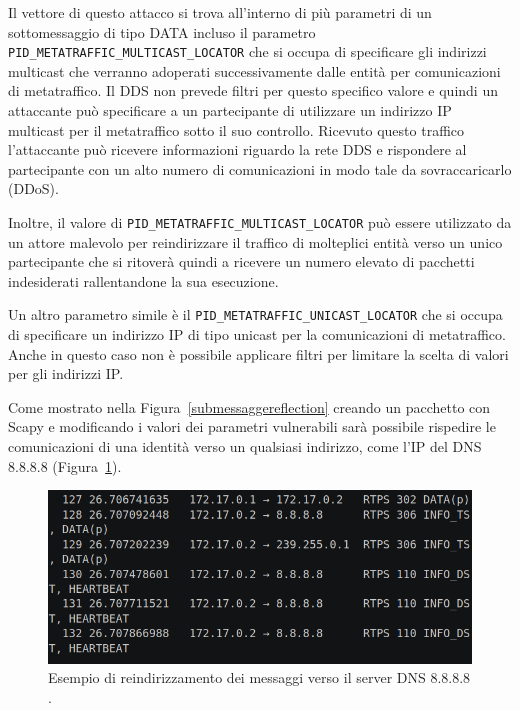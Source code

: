 Il vettore di questo attacco si trova all'interno di più parametri 
di un sottomessaggio di tipo DATA 
incluso il parametro 
\texttt{PID\_METATRAFFIC\_MULTICAST\_LOCATOR} che si occupa di specificare 
gli indirizzi multicast che verranno adoperati successivamente dalle 
entità per comunicazioni di metatraffico.
Il DDS non prevede filtri per questo 
specifico valore e quindi un attaccante può specificare a un 
partecipante di utilizzare un indirizzo IP multicast per il metatraffico 
sotto il suo controllo. Ricevuto questo traffico l'attaccante può 
ricevere informazioni riguardo la rete DDS e rispondere al partecipante
con un alto numero di comunicazioni in modo tale da sovraccaricarlo (DDoS).

Inoltre, il valore 
di \texttt{PID\_METATRAFFIC\_MULTICAST\_LOCATOR} può essere utilizzato 
da un attore malevolo per reindirizzare il traffico di molteplici 
entità verso un unico partecipante che si ritoverà quindi a ricevere un 
numero elevato di pacchetti indesiderati rallentandone la sua esecuzione.

Un altro parametro simile è il \texttt{PID\_METATRAFFIC\_UNICAST\_LOCATOR}
che si occupa di specificare un indirizzo IP di tipo unicast 
per la comunicazioni di metatraffico. Anche in questo caso non è
possibile applicare filtri per limitare la scelta di valori per 
gli indirizzi IP. 

Come mostrato nella 
Figura~\ref{submessaggereflection} creando un pacchetto con Scapy e
modificando i valori dei parametri vulnerabili 
sarà possibile 
rispedire le comunicazioni di una identità verso un qualsiasi
indirizzo, come l'IP del DNS 8.8.8.8 (Figura~\ref{reflectionattackdns}).


\begin{figure}[H]
    \centering
    \includegraphics[width=15.2cm, keepaspectratio]{img/reflectionattackdns.png}
    \caption{Esempio di reindirizzamento dei messaggi verso il server DNS 8.8.8.8
    \cite{mayoral2022robot}.}
    \label{reflectionattackdns}
\end{figure}

